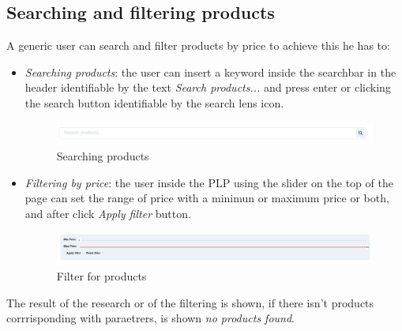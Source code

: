 \subsection{Searching and filtering products}
A generic user can search and filter products by price to achieve this he has to:
\begin{itemize}
    \item  \textit{Searching products}: the user can insert a keyword inside the searchbar in the header identifiable by the text \textit{Search products...} and press enter or clicking the search button identifiable by the search lens icon.
          \begin{figure}[!ht]
              \caption{Searching products}
              \vspace{10px}
              \includegraphics[scale=0.2]{../../../../Images/userManual/searcbar.png}
              \centering
          \end{figure}
    \item \textit{Filtering by price}: the user inside the PLP using the slider on the top of the page can set the range of price with a minimun or maximum price or both, and after click \textit{Apply filter} button.
          \begin{figure}[!ht]
              \caption{Filter for products}
              \vspace{10px}
              \includegraphics[scale=0.2]{../../../../Images/userManual/filter.png}
              \centering
          \end{figure}
\end{itemize}
The result of the research or of the filtering is shown, if there isn't products corrrisponding with paraetrers, is shown \textit{no products found}.
\newpage
